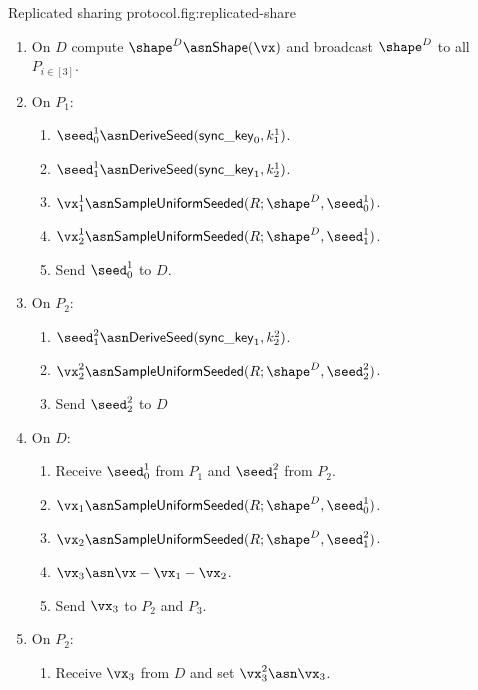 \begin{Boxfig}{Replicated sharing protocol.}{fig:replicated-share}
\begin{enumerate}
      \begin{enumerate}
        \item On $D$ compute $\shape^D \asn \mathsf{Shape}(\vx)$ and broadcast $\shape^D$ to all $P_{i \in [3]}$.

        \item On $P_1$:
        \begin{enumerate}
          \item $\seed_0^1 \asn \mathsf{DeriveSeed}(\mathsf{sync\_key}_0, k_1^1)$.
          \item $\seed_1^1 \asn \mathsf{DeriveSeed}(\mathsf{sync\_key}_1, k_2^1)$.
          \item $\vx_1^1 \asn \mathsf{SampleUniformSeeded}(R; \shape^D, \seed_0^1)$.
          \item $\vx_2^1 \asn \mathsf{SampleUniformSeeded}(R; \shape^D, \seed_1^1)$.
          \item Send $\seed_0^1$ to $D$.
        \end{enumerate}

        \item On $P_2$:
        \begin{enumerate}
          \item $\seed_1^2 \asn \mathsf{DeriveSeed}(\mathsf{sync\_key}_1, k_2^2)$.
          \item $\vx_2^2 \asn \mathsf{SampleUniformSeeded}(R; \shape^D, \seed_2^2)$.
          \item Send $\seed_2^2$ to $D$
        \end{enumerate}

        \item On $D$:
        \begin{enumerate}
          \item Receive $\seed_0^1$ from $P_1$ and $\seed_1^2$ from $P_2$.
          \item $\vx_1 \asn \mathsf{SampleUniformSeeded}(R; \shape^D, \seed_0^1)$.
          \item $\vx_2 \asn \mathsf{SampleUniformSeeded}(R; \shape^D, \seed_1^2)$.
          \item $\vx_3 \asn \vx - \vx_1 - \vx_2$.
          \item Send $\vx_3$ to $P_2$ and $P_3$.
        \end{enumerate}

        \item On $P_2$:
        \begin{enumerate}
          \item Receive $\vx_3$ from $D$ and set $\vx_3^2 \asn \vx_3$.
        \end{enumerate}


\end{enumerate}
\end{enumerate}
\end{Boxfig}
